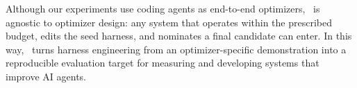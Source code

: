 Although our experiments use coding agents as end-to-end optimizers,
\heb\ is agnostic to optimizer design: any system that operates within
the prescribed budget, edits the seed harness, and nominates a final
candidate can enter. In this way, \heb\ turns harness engineering from
an optimizer-specific demonstration into a reproducible evaluation
target for measuring and developing systems that improve AI agents.



